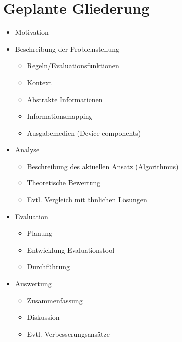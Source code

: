 \section{Geplante Gliederung}
\begin{itemize}
    \item  Motivation
    \item  Beschreibung der Problemstellung
    \begin{itemize}
        \item  Regeln/Evaluationsfunktionen
        \item  Kontext
        \item  Abstrakte Informationen
        \item  Informationsmapping
        \item  Ausgabemedien (Device components)
    \end{itemize}
    \item  Analyse
    \begin{itemize}
        \item  Beschreibung des aktuellen Ansatz (Algorithmus)
        \item  Theoretische Bewertung
        \item  Evtl. Vergleich mit ähnlichen Lösungen
    \end{itemize}
    \item  Evaluation
    \begin{itemize}
        \item  Planung
        \item  Entwicklung Evaluationstool
        \item  Durchführung
    \end{itemize}
    \item  Auswertung
     \begin{itemize}
     	\item  Zusammenfassung
     	\item  Diskussion
        \item  Evtl. Verbesserungsansätze
    \end{itemize}
\end{itemize}


